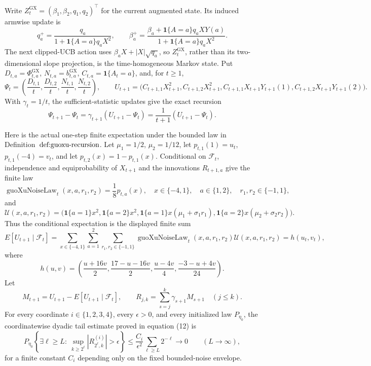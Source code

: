 Write \(Z^{\mathrm{GX}}_t=(\beta_1,\beta_2,q_1,q_2)^\top\) for the current augmented state. Its induced armwise update is
\[
q_a^+=\frac{q_a}{1+\mathbf 1\{A=a\}q_aX^2},\qquad
\beta_a^+=\frac{\beta_a+\mathbf 1\{A=a\}q_aXY(a)}{1+\mathbf 1\{A=a\}q_aX^2}.
\]
The next clipped-UCB action uses \(\beta_aX+|X|\sqrt{q_a}\), so \(Z^{\mathrm{GX}}_t\), rather than its two-dimensional slope projection, is the time-homogeneous Markov state. Put \(D_{t,a}=\Phi^{\mathrm{GX}}_{t,a}\), \(N_{t,a}=b^{\mathrm{GX}}_{t,a}\), \(C_{t,a}=\mathbf 1\{A_t=a\}\), and, for \(t\geq1\),
\[
\Psi_t=\left(\frac{D_{t,1}}t,\frac{D_{t,2}}t,\frac{N_{t,1}}t,\frac{N_{t,2}}t\right),\qquad
U_{t+1}=\bigl(C_{t+1,1}X_{t+1}^2,C_{t+1,2}X_{t+1}^2,
C_{t+1,1}X_{t+1}Y_{t+1}(1),C_{t+1,2}X_{t+1}Y_{t+1}(2)\bigr).
\]
With \(\gamma_t=1/t\), the sufficient-statistic updates give the exact recursion
\[
\Psi_{t+1}-\Psi_t=\gamma_{t+1}(U_{t+1}-\Psi_t)=\frac1{t+1}(U_{t+1}-\Psi_t).
\]

Here is the actual one-step finite expectation under the bounded law in Definition~\(\textnormal{def:guoxu-recursion}\). Let \(\mu_1=1/2\), \(\mu_2=1/12\), let \(p_{t,1}(1)=u_t\), \(p_{t,1}(-4)=v_t\), and let \(p_{t,2}(x)=1-p_{t,1}(x)\). Conditional on \(\mathcal F_t\), independence and equiprobability of \(X_{t+1}\) and the innovations \(R_{t+1,a}\) give the finite law
\[
\operatorname{guoXuNoiseLaw}_t(x,a,r_1,r_2)
=\frac18p_{t,a}(x),
\quad x\in\{-4,1\},\quad a\in\{1,2\},\quad r_1,r_2\in\{-1,1\},
\]
and
\[
\mathcal U(x,a,r_1,r_2)=
\bigl(\mathbf1\{a=1\}x^2,\mathbf1\{a=2\}x^2,
\mathbf1\{a=1\}x(\mu_1+\sigma_1r_1),
\mathbf1\{a=2\}x(\mu_2+\sigma_2r_2)\bigr).
\]
Thus the conditional expectation is the displayed finite sum
\[
E[U_{t+1}\mid\mathcal F_t]
=\sum_{x\in\{-4,1\}}\sum_{a=1}^2\sum_{r_1,r_2\in\{-1,1\}}
\operatorname{guoXuNoiseLaw}_t(x,a,r_1,r_2)\mathcal U(x,a,r_1,r_2)
=h(u_t,v_t),
\]
where
\[
h(u,v)=\left(\frac{u+16v}{2},\frac{17-u-16v}{2},
\frac{u-4v}{4},\frac{-3-u+4v}{24}\right).
\]
Let
\[
M_{t+1}=U_{t+1}-E[U_{t+1}\mid\mathcal F_t],
\qquad
R_{j,k}=\sum_{s=j}^k\gamma_{s+1}M_{s+1}\quad(j\leq k).
\]
For every coordinate \(i\in\{1,2,3,4\}\), every \(\epsilon>0\), and every initialized law \(P_{\eta_0}\), the coordinatewise dyadic tail estimate proved in equation (12) is
\[
P_{\eta_0}\!\left\{\exists\ell\geq L:\ 
\sup_{k\geq2^\ell}\left|R_{2^\ell,k}^{(i)}\right|>\epsilon\right\}
\leq \frac{C_i}{\epsilon^2}\sum_{\ell\geq L}2^{-\ell}
\longrightarrow0\qquad(L\to\infty),
\]
for a finite constant \(C_i\) depending only on the fixed bounded-noise envelope.

